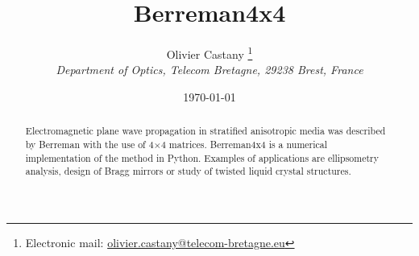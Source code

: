 \documentclass[a4paper, 10pt, oneside, twocolumn, openany]{memoir}
\begin{document}
\begin{titlingpage}

\pretitle{\begin{center}\Huge\sffamily\bfseries}
\posttitle{\par\end{center}\vskip 3.5cm}

\postauthor{\end{tabular}\par}

\postdate{\end{tabular}\par\vskip 1cm}

\usethanksrule
\thanksheadextra{(}{)}

\setlength{\absparindent}{0pt}
\makeatletter\renewcommand{\absnamepos}{@bstr@ctlist}\makeatother
\renewcommand{\abstractnamefont}{\normalfont\bfseries}
\renewcommand{\abstracttextfont}{\normalfont}

\title{Berreman4x4}

\author{\textsf{Olivier Castany}%
    \thanks{Electronic mail: 
    \href{mailto:olivier.castany@telecom-bretagne.eu}%
         {olivier.castany@telecom-bretagne.eu}}\\
    \emph{Department of Optics, Telecom Bretagne, 29238 Brest, France}
}

\date{\today}

\maketitle

\begin{abstract}
Electromagnetic plane wave propagation in stratified anisotropic media was described by Berreman with the use of 4$\times$4 matrices.
Berreman4x4 is a numerical implementation of the method in Python.
Examples of applications are ellipsometry analysis, design of Bragg mirrors or study of twisted liquid crystal structures.
\end{abstract}

\end{titlingpage}









\end{document}
